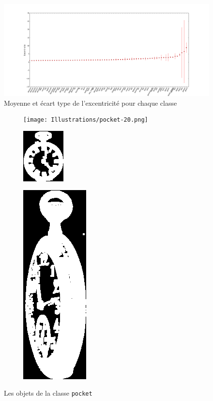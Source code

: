 \documentclass{article}
\theoremstyle{definition}
\begin{document}
	  \begin{figure}[!h]
	    \begin{bigcenter}
	      \includegraphics[scale=0.38]{Graphes/eccentricity.png}
	    \end{bigcenter}
	    \caption{Moyenne et écart type de l'excentricité pour chaque classe}
	    \label{eccentricity-graph}
	  \end{figure}
	  
	  \begin{figure}[!h]
	    \centering
	    \begin{subfigure}{.2\textwidth}
	      \centering
	      \texttt{[image: Illustrations/pocket-20.png]}
	    \end{subfigure}
	    \begin{subfigure}{.2\textwidth}
	      \centering
	      \includegraphics[scale=.9]{Illustrations/pocket-9.png}
	    \end{subfigure}
	    \begin{subfigure}{.15\textwidth}
	      \centering
	      \includegraphics[scale=0.235]{Illustrations/pocket-14.png}
	    \end{subfigure}
	    \caption{Les objets de la classe \texttt{pocket}}
	    \label{class-pocket}
	  \end{figure}
	  
\end{document}
